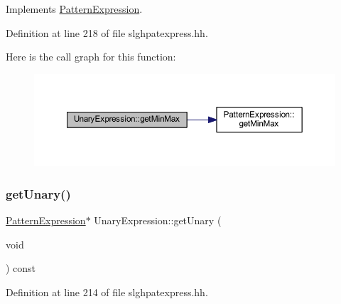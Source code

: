 Implements \mbox{\hyperlink{class_pattern_expression_a4ceb88e89308ac58bf1af4174228f3a0}{Pattern\+Expression}}.



Definition at line 218 of file slghpatexpress.\+hh.

Here is the call graph for this function\+:
\nopagebreak
\begin{figure}[H]
\begin{center}
\leavevmode
\includegraphics[width=350pt]{class_unary_expression_a1fec3bdcd57cc6bca29f8a00f0e7c406_cgraph}
\end{center}
\end{figure}
\mbox{\label{class_unary_expression_aa24bf2ae1eb73a512af77b740d00ab75}} 
\subsubsection{\texorpdfstring{getUnary()}{getUnary()}}
{\footnotesize\ttfamily \mbox{\hyperlink{class_pattern_expression}{Pattern\+Expression}}$\ast$ Unary\+Expression\+::get\+Unary (\begin{DoxyParamCaption}\item[{void}]{ }\end{DoxyParamCaption}) const\hspace{0.3cm}{\ttfamily [inline]}}



Definition at line 214 of file slghpatexpress.\+hh.

